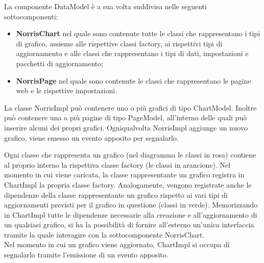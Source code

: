 La componente DataModel è a sua volta suddivisa nelle seguenti sottocomponenti:
\begin{itemize}
\item \textbf{NorrisChart} nel quale sono contenute tutte le classi che rappresentano i tipi di grafico, assieme alle rispettive classi factory, ai rispettivi tipi di aggiornamento e alle classi che rappresentano i tipi di dati, impostazioni e pacchetti di aggiornamento; 
\item \textbf{NorrisPage} nel quale sono contenute le classi che rappresentano le pagine web e le rispettive impostazioni.
\end{itemize}

La classe NorrisImpl può contenere uno o più grafici di tipo ChartModel. Inoltre può contenere una o più pagine di tipo PageModel, all'interno delle quali può inserire alcuni dei propri grafici. Ogniqualvolta NorrisImpl aggiunge un nuovo grafico, viene emesso un evento apposito per segnalarlo.

Ogni classe che rappresenta un grafico (nel diagramma le classi in rosa) contiene al proprio interno la rispettiva classe factory (le classi in arancione). Nel momento in cui viene caricata, la classe rappresentante un grafico registra in ChartImpl la propria classe factory. Analogamente, vengono registrate anche le dipendenze della classe rappresentante un grafico rispetto ai vari tipi di aggiornamenti previsti per il grafico in questione (classi in verde). Memorizzando in ChartImpl tutte le dipendenze necessarie alla creazione e all'aggiornamento di un qualsiasi grafico, si ha la possibilità di fornire all'esterno un'unica interfaccia tramite la quale interagire con la sottocomponente NorrisChart.\\
Nel momento in cui un grafico viene aggiornato, ChartImpl si occupa di segnalarlo tramite l'emissione di un evento apposito.

